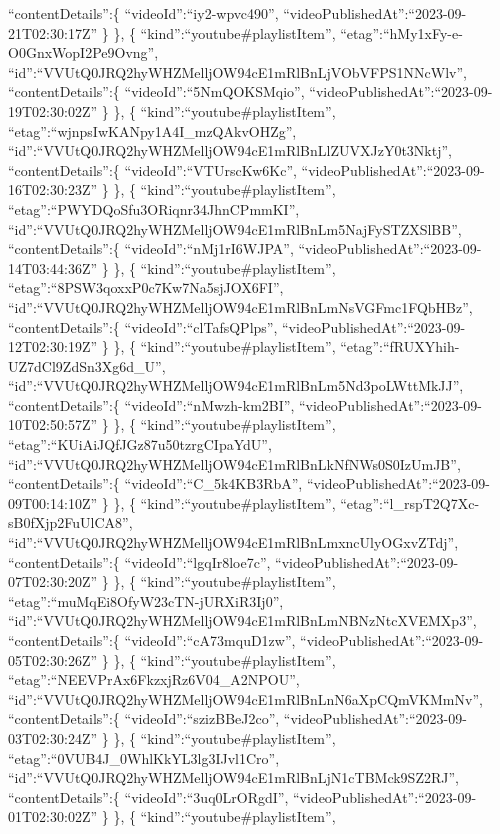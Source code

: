 \documentclass[11pt]{article}
\begin{document}
``contentDetails'':\{ ``videoId'':``iy2-wpvc490'',
``videoPublishedAt'':``2023-09-21T02:30:17Z'' \} \}, \{
``kind'':``youtube\#playlistItem'',
``etag'':``hMy1xFy-e-O0GnxWopI2Pe9Ovng'',
``id'':``VVUtQ0JRQ2hyWHZMelljOW94cE1mRlBnLjVObVFPS1NNcWlv'',
``contentDetails'':\{ ``videoId'':``5NmQOKSMqio'',
``videoPublishedAt'':``2023-09-19T02:30:02Z'' \} \}, \{
``kind'':``youtube\#playlistItem'',
``etag'':``wjnpsIwKANpy1A4I\_mzQAkvOHZg'',
``id'':``VVUtQ0JRQ2hyWHZMelljOW94cE1mRlBnLlZUVXJzY0t3Nktj'',
``contentDetails'':\{ ``videoId'':``VTUrscKw6Kc'',
``videoPublishedAt'':``2023-09-16T02:30:23Z'' \} \}, \{
``kind'':``youtube\#playlistItem'',
``etag'':``PWYDQoSfu3ORiqnr34JhnCPmmKI'',
``id'':``VVUtQ0JRQ2hyWHZMelljOW94cE1mRlBnLm5NajFySTZXSlBB'',
``contentDetails'':\{ ``videoId'':``nMj1rI6WJPA'',
``videoPublishedAt'':``2023-09-14T03:44:36Z'' \} \}, \{
``kind'':``youtube\#playlistItem'',
``etag'':``8PSW3qoxxP0c7Kw7Na5sjJOX6FI'',
``id'':``VVUtQ0JRQ2hyWHZMelljOW94cE1mRlBnLmNsVGFmc1FQbHBz'',
``contentDetails'':\{ ``videoId'':``clTafsQPlps'',
``videoPublishedAt'':``2023-09-12T02:30:19Z'' \} \}, \{
``kind'':``youtube\#playlistItem'',
``etag'':``fRUXYhih-UZ7dCl9ZdSn3Xg6d\_U'',
``id'':``VVUtQ0JRQ2hyWHZMelljOW94cE1mRlBnLm5Nd3poLWttMkJJ'',
``contentDetails'':\{ ``videoId'':``nMwzh-km2BI'',
``videoPublishedAt'':``2023-09-10T02:50:57Z'' \} \}, \{
``kind'':``youtube\#playlistItem'',
``etag'':``KUiAiJQfJGz87u50tzrgCIpaYdU'',
``id'':``VVUtQ0JRQ2hyWHZMelljOW94cE1mRlBnLkNfNWs0S0IzUmJB'',
``contentDetails'':\{ ``videoId'':``C\_5k4KB3RbA'',
``videoPublishedAt'':``2023-09-09T00:14:10Z'' \} \}, \{
``kind'':``youtube\#playlistItem'',
``etag'':``l\_rspT2Q7Xc-sB0fXjp2FuUlCA8'',
``id'':``VVUtQ0JRQ2hyWHZMelljOW94cE1mRlBnLmxncUlyOGxvZTdj'',
``contentDetails'':\{ ``videoId'':``lgqIr8loe7c'',
``videoPublishedAt'':``2023-09-07T02:30:20Z'' \} \}, \{
``kind'':``youtube\#playlistItem'',
``etag'':``muMqEi8OfyW23cTN-jURXiR3Ij0'',
``id'':``VVUtQ0JRQ2hyWHZMelljOW94cE1mRlBnLmNBNzNtcXVEMXp3'',
``contentDetails'':\{ ``videoId'':``cA73mquD1zw'',
``videoPublishedAt'':``2023-09-05T02:30:26Z'' \} \}, \{
``kind'':``youtube\#playlistItem'',
``etag'':``NEEVPrAx6FkzxjRz6V04\_A2NPOU'',
``id'':``VVUtQ0JRQ2hyWHZMelljOW94cE1mRlBnLnN6aXpCQmVKMmNv'',
``contentDetails'':\{ ``videoId'':``szizBBeJ2co'',
``videoPublishedAt'':``2023-09-03T02:30:24Z'' \} \}, \{
``kind'':``youtube\#playlistItem'',
``etag'':``0VUB4J\_0WhlKkYL3lg3IJvl1Cro'',
``id'':``VVUtQ0JRQ2hyWHZMelljOW94cE1mRlBnLjN1cTBMck9SZ2RJ'',
``contentDetails'':\{ ``videoId'':``3uq0LrORgdI'',
``videoPublishedAt'':``2023-09-01T02:30:02Z'' \} \}, \{
``kind'':``youtube\#playlistItem'',
\end{document}
